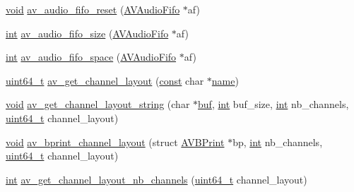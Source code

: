 \begin{DoxyCompactItemize}
\item 
\hyperlink{sound_8c_ae35f5844602719cf66324f4de2a658b3}{void} \hyperlink{group__lavu__audio_ga3f070386d11d425302437a3b60fc5dd0}{av\+\_\+audio\+\_\+fifo\+\_\+reset} (\hyperlink{group__lavu__audio_ga328abb21e9abb2c455d2d9c212d5230f}{A\+V\+Audio\+Fifo} $\ast$af)
\item 
\hyperlink{xmltok_8h_a5a0d4a5641ce434f1d23533f2b2e6653}{int} \hyperlink{group__lavu__audio_gaa0a4742ecac52a999e8b4478d27f3b9b}{av\+\_\+audio\+\_\+fifo\+\_\+size} (\hyperlink{group__lavu__audio_ga328abb21e9abb2c455d2d9c212d5230f}{A\+V\+Audio\+Fifo} $\ast$af)
\item 
\hyperlink{xmltok_8h_a5a0d4a5641ce434f1d23533f2b2e6653}{int} \hyperlink{group__lavu__audio_ga2bed2f01fe34228ee8a73617b3177d00}{av\+\_\+audio\+\_\+fifo\+\_\+space} (\hyperlink{group__lavu__audio_ga328abb21e9abb2c455d2d9c212d5230f}{A\+V\+Audio\+Fifo} $\ast$af)
\item 
\hyperlink{lib-src_2ffmpeg_2win32_2stdint_8h_aec6fcb673ff035718c238c8c9d544c47}{uint64\+\_\+t} \hyperlink{group__lavu__audio_ga3e8a7ab3d4c1ac98b902ab6b00741343}{av\+\_\+get\+\_\+channel\+\_\+layout} (\hyperlink{getopt1_8c_a2c212835823e3c54a8ab6d95c652660e}{const} char $\ast$\hyperlink{lib_2expat_8h_a1b49b495b59f9e73205b69ad1a2965b0}{name})
\item 
\hyperlink{sound_8c_ae35f5844602719cf66324f4de2a658b3}{void} \hyperlink{group__lavu__audio_ga99d0b5bb80534d13a6cc96336cf9076a}{av\+\_\+get\+\_\+channel\+\_\+layout\+\_\+string} (char $\ast$\hyperlink{xlstr_8c_a781718f5b53a876fe91c424c4607fa8f}{buf}, \hyperlink{xmltok_8h_a5a0d4a5641ce434f1d23533f2b2e6653}{int} buf\+\_\+size, \hyperlink{xmltok_8h_a5a0d4a5641ce434f1d23533f2b2e6653}{int} nb\+\_\+channels, \hyperlink{lib-src_2ffmpeg_2win32_2stdint_8h_aec6fcb673ff035718c238c8c9d544c47}{uint64\+\_\+t} channel\+\_\+layout)
\item 
\hyperlink{sound_8c_ae35f5844602719cf66324f4de2a658b3}{void} \hyperlink{group__lavu__audio_ga48cdbfac1bbb45835eae8bcdc9877b0e}{av\+\_\+bprint\+\_\+channel\+\_\+layout} (struct \hyperlink{struct_a_v_b_print}{A\+V\+B\+Print} $\ast$bp, \hyperlink{xmltok_8h_a5a0d4a5641ce434f1d23533f2b2e6653}{int} nb\+\_\+channels, \hyperlink{lib-src_2ffmpeg_2win32_2stdint_8h_aec6fcb673ff035718c238c8c9d544c47}{uint64\+\_\+t} channel\+\_\+layout)
\item 
\hyperlink{xmltok_8h_a5a0d4a5641ce434f1d23533f2b2e6653}{int} \hyperlink{group__lavu__audio_gac95619abeb32e4a3daa18e3ff3419380}{av\+\_\+get\+\_\+channel\+\_\+layout\+\_\+nb\+\_\+channels} (\hyperlink{lib-src_2ffmpeg_2win32_2stdint_8h_aec6fcb673ff035718c238c8c9d544c47}{uint64\+\_\+t} channel\+\_\+layout)

\end{DoxyCompactItemize}
